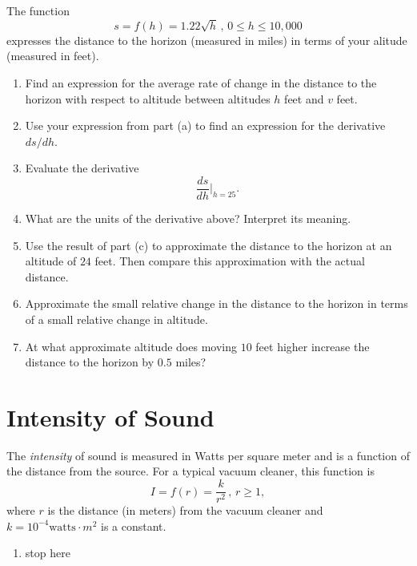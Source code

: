 \documentclass{ximera}
\begin{document}
\begin{question} \label{Qdggbrgthghghb}
The function
\[
      s = f(h) = 1.22\sqrt{h} \, , \, 0\leq h \leq 10,000
\]
expresses the distance to the horizon (measured in miles) in terms of your alitude (measured in feet).

\begin{enumerate}
\item Find an expression for the average rate of change in the distance to the horizon with respect to altitude between altitudes $h$ feet and $v$ feet.

\item Use your expression from part (a) to find an expression for the derivative $ds/dh$.

\item Evaluate the derivative 
\[
       \frac{ds}{dh}\Big|_{h=25} .
\]

\item What are the units of the derivative above? Interpret its meaning.

\item Use the result of part (c) to approximate the distance to the horizon at an altitude of $24$ feet. Then compare this approximation with the actual distance.

\item Approximate the small relative change in the distance to the horizon in terms of a small relative change in altitude.

\item At what approximate altitude does moving $10$ feet higher increase the distance to the horizon by $0.5$ miles?

\end{enumerate}
\end{question}




\section{Intensity of Sound}

\begin{question}  \label{Qdfdgt446666}
The \emph{intensity} of sound is measured in Watts per square meter and is a function of the distance from the source. For a typical vacuum cleaner, this function is
\[
          I = f(r) = \frac{k}{r^2} \, , \, r\geq 1 ,
\]
where $r$ is the distance (in meters) from the vacuum cleaner and $k=10^{-4}\text{watts}\cdot m^2$ is a constant.

\begin{enumerate}
\item stop here
\end{enumerate}

\end{question}
\end{document}
